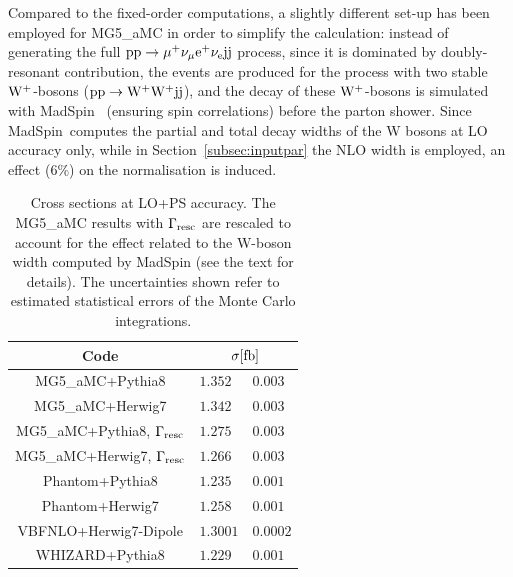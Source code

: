 \documentclass[twocolumn,epjc3]{svjour3} %
\newlength{\width}
\begin{document}
Compared to the fixed-order computations, a slightly different set-up has been employed for {\sc MG5\_aMC} in order to simplify the calculation: instead of generating the full
${\rm p}{\rm p}\to\mu^+\nu_\mu{\rm e}^+\nu_{\rm e}{\rm j}{\rm j}$ process, since it is dominated by doubly-resonant contribution, the
events are produced for the process with two stable ${\rm W}^+$-bosons (${\rm p}{\rm p}\to{\rm W^+}{\rm W^+}{\rm j}{\rm j}$), and the decay of these ${\rm W}^+$-bosons
is simulated with {\sc MadSpin}~\cite{Artoisenet:2012st} (ensuring spin correlations) before the parton shower. Since {\sc MadSpin}\ computes
the partial and total decay widths of the W bosons at LO accuracy only, while in Section~\ref{subsec:inputpar} the NLO width is employed,
an effect ($6\%$) on the normalisation is induced. 

\begin{table}
    \centering
    \begin{tabular}{c|l@{ $\pm$ }l}
      Code  &  \multicolumn{2}{c}{$\sigma[\rm{fb}]$}  \\
        \hline\hline
        {\sc MG5\_aMC}+{\sc Pythia8}&  $1.352 $ & $0.003$  \\
        {\sc MG5\_aMC}+{\sc Herwig7}&  $1.342 $ & $ 0.003$  \\
        {\sc MG5\_aMC}+{\sc Pythia8}, $\Gamma_{\rm resc}$&  $1.275$ & $0.003$  \\
        {\sc MG5\_aMC}+{\sc Herwig7}, $\Gamma_{\rm resc}$&  $1.266$ & $ 0.003$  \\
        {\sc Phantom}+{\sc Pythia8} &  $1.235 $ & $0.001$  \\
        {\sc Phantom}+{\sc Herwig7} &  $1.258 $ & $0.001$  \\
        {\sc VBFNLO}+{\sc Herwig7-Dipole} &  $1.3001$ & $0.0002$  \\
        {\sc WHIZARD}+{\sc Pythia8} &  $1.229$ & $0.001$  \\
    \end{tabular}
    \caption{\label{tab:PSratesLO} Cross sections at LO+PS accuracy.
    The {\sc MG5\_aMC} results with $\Gamma_{\rm resc}$
    are rescaled to account for the effect related to the W-boson width computed by {\sc MadSpin} (see the text for details).
    The uncertainties shown refer to estimated statistical errors of the Monte Carlo integrations.}
\end{table}
\end{document}
